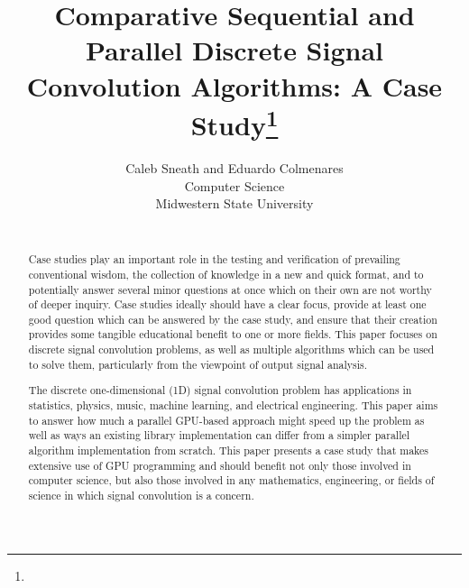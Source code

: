 \documentclass{article}
\title{Comparative Sequential and Parallel Discrete Signal Convolution Algorithms: A Case Study\footnote{\protect}
}
\author{
Caleb Sneath and Eduardo Colmenares\\
Computer Science\\
Midwestern State University\\
\email{\{caleb.sneath, eduardo.colmenares\}@msutexas.edu}\\
}
\begin{document}
\maketitle

\begin{abstract}
Case studies play an important role in the testing and verification of prevailing conventional wisdom, the collection of knowledge in a new and quick format, and to potentially answer several minor questions at once which on their own are not worthy of deeper inquiry. Case studies ideally should have a clear focus, provide at least one good question which can be answered by the case study, and ensure that their creation provides some tangible educational benefit to one or more fields. This paper focuses on discrete signal convolution problems, as well as multiple algorithms which can be used to solve them, particularly from the viewpoint of output signal analysis. 

The discrete one-dimensional (1D) signal convolution problem has applications in statistics, physics, music, machine learning, and electrical engineering. This paper aims to answer how much a parallel GPU-based approach might speed up the problem as well as ways an existing library implementation can differ from a simpler parallel algorithm implementation from scratch. This paper presents a case study that makes extensive use of GPU programming and should benefit not only those involved in computer science, but also those involved in any mathematics, engineering, or fields of science in which signal convolution is a concern. 
\end{abstract}
\end{document}
